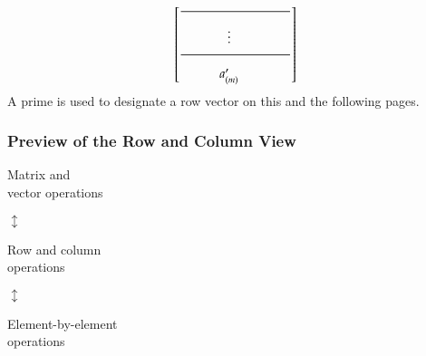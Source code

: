 \documentclass[10pt]{beamer}
\begin{document}
\begin{frame}
\begin{minipage}[t]{0.45\textwidth}
\begin{equation*}
\begin{bmatrix}
                   \dfrac{\makebox[1.2in]{}}{\makebox[1.2in]{}} \\
                   \begin{matrix} & & \vdots & & & \end{matrix} \\
                   \dfrac{\makebox[1.2in]{}}{\makebox[1.2in]{}} \\
                   \begin{matrix} & & a'_{(m)}& & & \end{matrix} \\
    \end{bmatrix}
\end{equation*}
A prime is used to designate a row vector on this and the following pages.
\end{minipage}

\end{frame}
\begin{frame}
\frametitle{Preview of the Row and Column View}

    \begin{center}
        \begin{minipage}{1.5in}
            \begin{center}
                Matrix and\\
                vector operations
            \end{center}
        \end{minipage}

        \hspace{0.125in}
        {\Large$\updownarrow$}
        \hspace{0.125in}

        \begin{minipage}{1.5in}
            \begin{center}
                Row and column\\
                operations
            \end{center}
        \end{minipage}

        \hspace{0.125in}
        {\Large$\updownarrow$}
        \hspace{0.125in}

        \begin{minipage}{1.5in}
            \begin{center}
                Element-by-element\\
                operations
            \end{center}
        \end{minipage}
        \end{center}
\end{frame}
\end{document}
